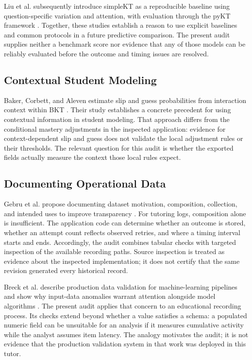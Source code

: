 \documentclass[conference]{IEEEtran}
\begin{document}
Liu et al. subsequently introduce simpleKT as a reproducible baseline using question-specific variation and attention, with evaluation through the pyKT framework \cite{liu2023simplekt}. Together, these studies establish a reason to use explicit baselines and common protocols in a future predictive comparison. The present audit supplies neither a benchmark score nor evidence that any of those models can be reliably evaluated before the outcome and timing issues are resolved.

\subsection{Contextual Student Modeling}
Baker, Corbett, and Aleven estimate slip and guess probabilities from interaction context within BKT \cite{baker2008context}. Their study establishes a concrete precedent for using contextual information in student modeling. That approach differs from the conditional mastery adjustments in the inspected application: evidence for context-dependent slip and guess does not validate the local adjustment rules or their thresholds. The relevant question for this audit is whether the exported fields actually measure the context those local rules expect.

\subsection{Documenting Operational Data}
Gebru et al. propose documenting dataset motivation, composition, collection, and intended uses to improve transparency \cite{gebru2021}. For tutoring logs, composition alone is insufficient. The application code can determine whether an outcome is stored, whether an attempt count reflects observed retries, and where a timing interval starts and ends. Accordingly, the audit combines tabular checks with targeted inspection of the available recording paths. Source inspection is treated as evidence about the inspected implementation; it does not certify that the same revision generated every historical record.

Breck et al. describe production data validation for machine-learning pipelines and show why input-data anomalies warrant attention alongside model algorithms \cite{breck2019validation}. The present audit applies that concern to an educational recording process. Its checks extend beyond whether a value satisfies a schema: a populated numeric field can be unsuitable for an analysis if it measures cumulative activity while the analyst assumes item latency. The analogy motivates the audit; it is not evidence that the production validation system in that work was deployed in this tutor.
\end{document}

